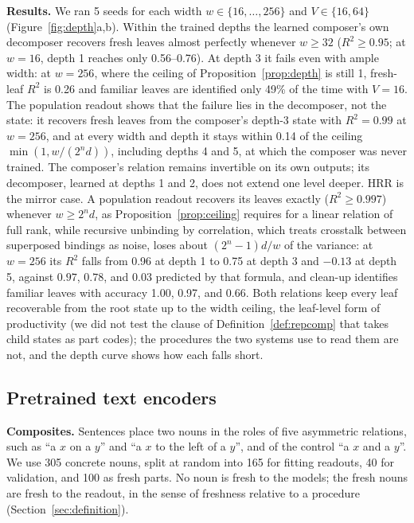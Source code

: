 \documentclass[10pt]{article}
\theoremstyle{plain}
\theoremstyle{remark}
\begin{document}
\textbf{Results.} We ran 5 seeds for each width $w \in \{16, \ldots, 256\}$ and $V \in \{16, 64\}$ (Figure~\ref{fig:depth}a,b). Within the trained depths the learned composer's own decomposer recovers fresh leaves almost perfectly whenever $w \ge 32$ ($R^2 \ge 0.95$; at $w = 16$, depth 1 reaches only 0.56--0.76). At depth 3 it fails even with ample width: at $w = 256$, where the ceiling of Proposition~\ref{prop:depth} is still 1, fresh-leaf $R^2$ is 0.26 and familiar leaves are identified only 49\% of the time with $V = 16$. The population readout shows that the failure lies in the decomposer, not the state: it recovers fresh leaves from the composer's depth-3 state with $R^2 = 0.99$ at $w = 256$, and at every width and depth it stays within 0.14 of the ceiling $\min(1, w/(2^n d))$, including depths 4 and 5, at which the composer was never trained. The composer's relation remains invertible on its own outputs; its decomposer, learned at depths 1 and 2, does not extend one level deeper. HRR is the mirror case. A population readout recovers its leaves exactly ($R^2 \ge 0.997$) whenever $w \ge 2^n d$, as Proposition~\ref{prop:ceiling} requires for a linear relation of full rank, while recursive unbinding by correlation, which treats crosstalk between superposed bindings as noise, loses about $(2^n - 1)d/w$ of the variance: at $w = 256$ its $R^2$ falls from 0.96 at depth 1 to 0.75 at depth 3 and $-0.13$ at depth 5, against $0.97$, $0.78$, and $0.03$ predicted by that formula, and clean-up identifies familiar leaves with accuracy 1.00, 0.97, and 0.66. Both relations keep every leaf recoverable from the root state up to the width ceiling, the leaf-level form of productivity (we did not test the clause of Definition~\ref{def:repcomp} that takes child states as part codes); the procedures the two systems use to read them are not, and the depth curve shows how each falls short.

\subsection{Pretrained text encoders}
\label{sec:pretrained}

\textbf{Composites.} Sentences place two nouns in the roles of five asymmetric relations, such as ``a $x$ on a $y$'' and ``a $x$ to the left of a $y$'', and of the control ``a $x$ and a $y$''. We use 305 concrete nouns, split at random into 165 for fitting readouts, 40 for validation, and 100 as fresh parts. No noun is fresh to the models; the fresh nouns are fresh to the readout, in the sense of freshness relative to a procedure (Section~\ref{sec:definition}).
\end{document}
